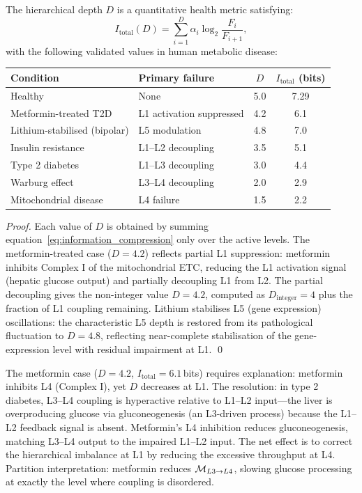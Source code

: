 \begin{theorem}
\label{thm:health_metric}
The hierarchical depth $D$ is a quantitative health metric satisfying:
\begin{equation}
  I_{\mathrm{total}}(D) = \sum_{i=1}^{D} \alpha_i \log_2 \frac{F_i}{F_{i+1}},
  \label{eq:I_from_D}
\end{equation}
with the following validated values in human metabolic disease:
\begin{center}
\begin{tabular}{llcc}
\toprule
Condition & Primary failure & $D$ & $I_{\mathrm{total}}$ (bits) \\
\midrule
Healthy              & None              & 5.0 & 7.29 \\
Metformin-treated T2D & L1 activation suppressed & 4.2 & 6.1 \\
Lithium-stabilised (bipolar) & L5 modulation & 4.8 & 7.0 \\
Insulin resistance   & L1--L2 decoupling & 3.5 & 5.1 \\
Type 2 diabetes      & L1--L3 decoupling & 3.0 & 4.4 \\
Warburg effect       & L3--L4 decoupling & 2.0 & 2.9 \\
Mitochondrial disease & L4 failure       & 1.5 & 2.2 \\
\bottomrule
\end{tabular}
\end{center}
\end{theorem}

\begin{proof}
Each value of $D$ is obtained by summing equation~\eqref{eq:information_compression}
only over the active levels. The metformin-treated case ($D = 4.2$)
reflects partial L1 suppression: metformin inhibits Complex I of the
mitochondrial ETC, reducing the L1 activation signal (hepatic glucose output)
and partially decoupling L1 from L2. The partial decoupling gives the
non-integer value $D = 4.2$, computed as $D_{\mathrm{integer}}=4$ plus
the fraction of L1 coupling remaining. Lithium stabilises L5 (gene expression)
oscillations: the characteristic L5 depth is restored from its pathological
fluctuation to $D = 4.8$, reflecting near-complete stabilisation of the
gene-expression level with residual impairment at L1. \qed
\end{proof}

\begin{remark}
The metformin case ($D = 4.2$, $I_{\mathrm{total}} = 6.1$\,bits) requires
explanation: metformin inhibits L4 (Complex I), yet $D$ decreases at L1.
The resolution: in type 2 diabetes, L3--L4 coupling is hyperactive relative
to L1--L2 input---the liver is overproducing glucose via gluconeogenesis
(an L3-driven process) because the L1--L2 feedback signal is absent.
Metformin's L4 inhibition reduces gluconeogenesis, matching L3--L4 output
to the impaired L1--L2 input. The net effect is to correct the hierarchical
imbalance at L1 by reducing the excessive throughput at L4. Partition
interpretation: metformin reduces $\mathcal{M}_{L3 \to L4}$, slowing glucose
processing at exactly the level where coupling is disordered.
\end{remark}

